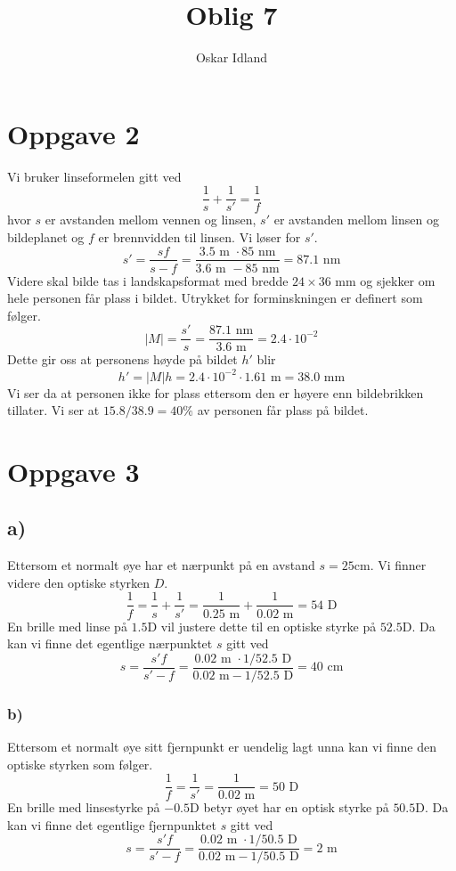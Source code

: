 \documentclass{article}
\author{Oskar Idland}
\title{Oblig 7}
\date{}
\begin{document}
\maketitle
\newpage
\section*{Oppgave 2}

Vi bruker linseformelen gitt ved
\[
\frac{1}{s} + \frac{1}{s'} = \frac{1}{f}
\]
hvor $s$ er avstanden mellom vennen og linsen, $s'$ er avstanden mellom linsen og bildeplanet og $f$ er brennvidden til linsen. Vi løser for $s'$.
\[
s' = \frac{sf}{s - f} = \frac{3.5\text{ m } ⋅ 85 \text{ nm}}{3.6 \text{ m } - 85 \text{ nm}} = 87.1 \text{ nm}
\]
Videre skal bilde tas i landskapsformat med bredde $24 × 36$ mm og sjekker om hele personen får plass i bildet. Utrykket for forminskningen er definert som følger. 
\[
\left|M\right| = \frac{s'}{s} = \frac{87.1 \text{ nm}}{3.6 \text{ m}} = 2.4 ⋅ 10^{-2}
\]
Dette gir oss at personens høyde på bildet $h'$ blir 
\[
h' = \left|M\right|h = 2.4 ⋅ 10^{-2} ⋅ 1.61 \text{ m} = 38.0 \text{ mm}
\]
Vi ser da at personen ikke for plass ettersom den er høyere enn bildebrikken tillater. Vi ser at $15.8 / 38.9 = 40 \%$ av personen får plass på bildet.

\section*{Oppgave 3}
\subsection*{a)}
Ettersom et normalt øye har et nærpunkt på en avstand $s = 25$cm. Vi finner videre den optiske styrken $D$. 
\[
\frac{1}{f} = \frac{1}{s} + \frac{1}{s'} = \frac{1}{0.25 \text{ m}} + \frac{1}{0.02 \text{ m}} = 54 \text{ D}
\]
En brille med linse på $1.5$D vil justere dette til en optiske styrke på $52.5$D. Da kan vi finne det egentlige nærpunktet $s$ gitt ved 
\[
s = \frac{s'f}{s' - f} = \frac{0.02 \text{ m } ⋅ 1 /52.5 \text{ D}}{0.02 \text{ m} - 1 /52.5 \text{ D}} = 40 \text{ cm}
\]

\subsubsection*{b)}
Ettersom et normalt øye sitt fjernpunkt er uendelig lagt unna kan vi finne den optiske styrken som følger. 
\[
\frac{1}{f} = \frac{1}{s'} = \frac{1}{0.02 \text{ m}} = 50 \text{ D}
\]
En brille med linsestyrke på $-0.5$D betyr øyet har en optisk styrke på $50.5$D. Da kan vi finne det egentlige fjernpunktet $s$ gitt ved
\[
s = \frac{s'f}{s' - f} = \frac{0.02 \text{ m } ⋅ 1 /50.5 \text{ D}}{0.02 \text{ m} - 1 /50.5 \text{ D}} = 2 \text{ m}
\]
\end{document}
